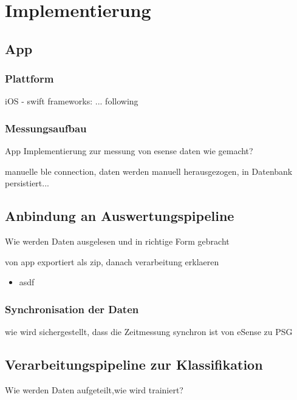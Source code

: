 \chapter{Implementierung}
\label{ch:Implementierung}

\section{App}
\subsection{Plattform}
iOS - swift
frameworks: ... following


\subsection{Messungsaufbau}
App Implementierung zur messung von esense daten wie gemacht?

manuelle ble connection, daten werden manuell herausgezogen, in Datenbank persistiert... 



\section{Anbindung an Auswertungspipeline}
Wie werden Daten ausgelesen und in richtige Form gebracht

von app exportiert als zip, danach verarbeitung erklaeren

\begin{itemize}
    \item asdf
\end{itemize}

\subsection{Synchronisation der Daten}
wie wird sichergestellt, dass die Zeitmessung synchron ist von eSense zu PSG

\section{Verarbeitungspipeline zur Klassifikation}
Wie werden Daten aufgeteilt,wie wird trainiert?
